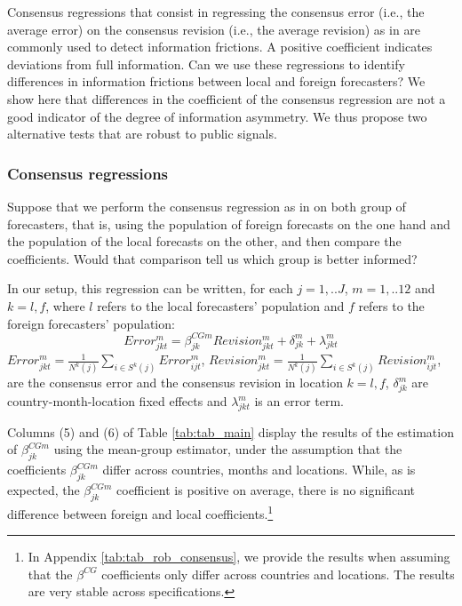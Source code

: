 
Consensus regressions that consist in regressing the consensus error (i.e., the average error) on the consensus revision (i.e., the average revision) as in \citet{CoibionGorodnichenko2015} are commonly used to detect information frictions. A positive coefficient indicates deviations from full information. Can we use these regressions to identify differences in information frictions between local and foreign forecasters?  We show here that differences in the coefficient of the consensus regression are not a good indicator of the degree of information asymmetry. We thus propose two alternative tests that are robust to public signals.

\subsubsection{Consensus regressions}


Suppose that we perform the consensus regression as in \citet{CoibionGorodnichenko2015} on both group of forecasters, that is, using the population of foreign forecasts on the one hand and the population of the local forecasts on the other, and then compare the coefficients. Would that comparison tell us which group is better informed?

In our setup, this regression can be written, for each $j=1,..J$, $m=1,..12$ and $k=l,f$, where $l$ refers to the local forecasters' population and $f$ refers to the foreign forecasters' population:
\begin{equation}Error_{jkt}^m=\beta^{CGm}_{jk}Revision_{jkt}^m+\delta_{jk}^m+\lambda_{jkt}^m\label{eq:consensus}
\end{equation}
$Error_{jkt}^m=\frac{1}{N^k(j)}\sum_{i\in\textit{S}^k(j)}Error_{ijt}^m$, $Revision_{jkt}^m=\frac{1}{N^k(j)}\sum_{i\in\textit{S}^k(j)}Revision_{ijt}^m$, are the consensus error and the consensus revision in location $k=l,f$, $\delta_{jk}^m$ are country-month-location fixed effects and $\lambda_{jkt}^m$ is an error term.

Columns (5) and (6) of Table \ref{tab:tab_main} display the results of the estimation of $\beta^{CGm}_{jk}$ using the mean-group estimator, under the assumption that the coefficients $\beta^{CGm}_{jk}$ differ across countries, months and locations. While, as is expected, the $\beta^{CGm}_{jk}$ coefficient is positive on average, there is no significant difference between foreign and local coefficients.\footnote{In Appendix \ref{tab:tab_rob_consensus}, we provide the results when assuming that the $\beta^{CG}$ coefficients only differ across countries and locations. The results are very stable across specifications.}

